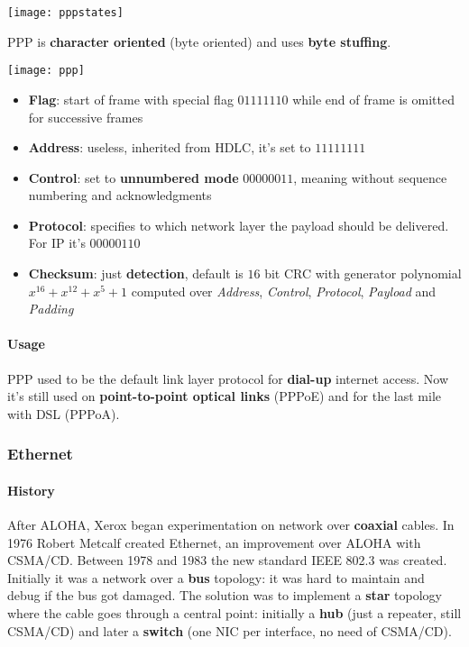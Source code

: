 \begin{center}
	\texttt{[image: pppstates]}
\end{center}
PPP is \textbf{character oriented} (byte oriented) and uses \textbf{byte stuffing}.
\begin{center}
	\texttt{[image: ppp]}
\end{center}
\begin{itemize}
	\item \textbf{Flag}: start of frame with special flag $01111110$ while end of frame is omitted for successive frames
	\item \textbf{Address}: useless, inherited from HDLC, it's set to $11111111$
	\item \textbf{Control}: set to \textbf{unnumbered mode} $00000011$, meaning without sequence numbering and acknowledgments
	\item \textbf{Protocol}: specifies to which network layer the payload should be delivered. For IP it's $00000110$
	\item \textbf{Checksum}: just \textbf{detection}, default is $16$ bit CRC with generator polynomial $x^{16}+x^{12}+x^5+1$ computed over \textit{Address}, \textit{Control}, \textit{Protocol}, \textit{Payload} and \textit{Padding}
\end{itemize}

\paragraph{Usage} PPP used to be the default link layer protocol for \textbf{dial-up} internet access. Now it's still used on \textbf{point-to-point optical links} (PPPoE) and for the last mile with DSL (PPPoA).

\subsubsection{Ethernet}
\paragraph{History} After ALOHA, Xerox began experimentation on network over \textbf{coaxial} cables. In 1976 Robert Metcalf created Ethernet, an improvement over ALOHA  with CSMA/CD. Between 1978 and 1983 the new standard IEEE 802.3 was created.\\
Initially it was a network over a \textbf{bus} topology: it was hard to maintain and debug if the bus got damaged. The solution was to implement a \textbf{star} topology where the cable goes through a central point: initially a \textbf{hub} (just a repeater, still CSMA/CD) and later a \textbf{switch} (one NIC per interface, no need of CSMA/CD).

